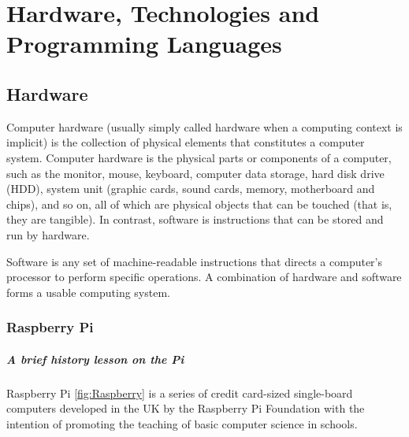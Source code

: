 
\chapter{Hardware, Technologies and Programming Languages} %

\label{Chapter2} %



\section{Hardware}
Computer hardware (usually simply called hardware when a computing context is implicit) is the collection of physical elements that constitutes a computer system. Computer hardware is the physical parts or components of a computer, such as the monitor, mouse, keyboard, computer data storage, hard disk drive (HDD), system unit (graphic cards, sound cards, memory, motherboard and chips), and so on, all of which are physical objects that can be touched (that is, they are tangible). In contrast, software is instructions that can be stored and run by hardware.


Software is any set of machine-readable instructions that directs a computer's processor to perform specific operations. A combination of hardware and software forms a usable computing system.


\subsection{Raspberry Pi}

\paragraph*{A brief history lesson on the Pi}
\hfill \break
Raspberry Pi \ref{fig:Raspberry} is a series of credit card-sized single-board computers developed in the UK by the Raspberry Pi Foundation with the intention of promoting the teaching of basic computer science in schools.


